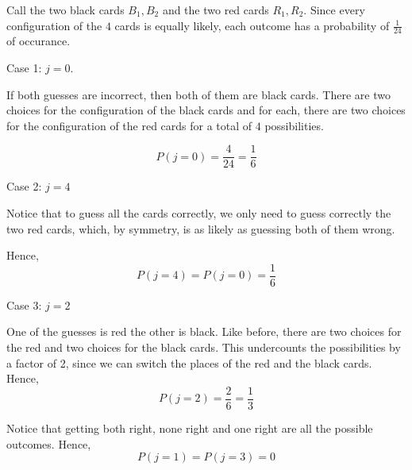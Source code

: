 Call the two black cards $B_{1}, B_{2}$ and the two red cards $R_{1}, R_{2}$.
Since every configuration of the $4$ cards is equally likely, each outcome has a probability of $\frac{1}{24}$ of occurance.

Case 1: $j = 0$.

If both guesses are incorrect, then both of them are black cards. There are two choices for the configuration of the black cards and for each, there are two choices for the configuration of the red cards for a total of $4$ possibilities.

$$P(j=0) = \frac{4}{24} = \frac{1}{6}$$

Case 2: $j = 4$

Notice that to guess all the cards correctly, we only need to guess correctly the two red cards, which, by symmetry, is as likely as guessing both of them wrong.

Hence, $$P(j=4) = P(j=0) = \frac{1}{6}$$

Case 3: $j=2$

One of the guesses is red the other is black. Like before, there are two choices for the red and two choices for the black cards. This undercounts the possibilities by a factor of 2, since we can switch the places of the red and the black cards. Hence, $$P(j=2) = \frac{2}{6} = \frac{1}{3}$$

Notice that getting both right, none right and one right are all the possible outcomes. Hence, $$P(j=1) = P(j=3) = 0$$